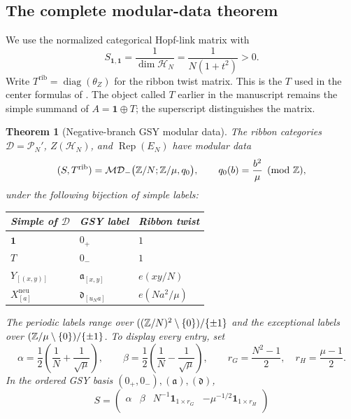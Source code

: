 \documentclass[11pt,a4paper]{article}
\numberwithin{equation}{section}
\newtheorem{theorem}{Theorem}[section]
\theoremstyle{definition}\newtheorem{definition}[theorem]{Definition}
\theoremstyle{remark}\newtheorem{remark}[theorem]{Remark}
\newcommand{\one}{\mathbf1}\newcommand{\B}{\mathcal B}\newcommand{\W}{W_N}
\newcommand{\Rep}{\operatorname{Rep}}\newcommand{\Ext}{\operatorname{Ext}}
\newcommand{\diag}{\operatorname{diag}}\renewcommand{\Vec}{\operatorname{Vec}}
\begin{document}
\subsection{The complete modular-data theorem}

We use the normalized categorical Hopf-link matrix with
\begin{equation}\label{eq:gsy-normalization}
 S_{\one,\one}=\frac1{\dim\mathcal H_N}
              =\frac1{N(1+t^2)}>0.
\end{equation}
Write $T^{\mathrm{rib}}=\diag(\theta_Z)$ for the ribbon twist matrix.
This is the $T$ used in the center formulas of \cite{gsy}.
The object called $T$ earlier in the manuscript remains the simple
summand of $A=\one\oplus T$; the superscript distinguishes the matrix.

\begin{theorem}[Negative-branch GSY modular data]\label{thm:gsy-modular}
The ribbon categories $\mathcal D=\mathcal P_N'$,
$Z(\mathcal H_N)$, and $\Rep(E_N)$ have modular data
\begin{equation}\label{eq:gsy-identification}
 (S,T^{\mathrm{rib}})
 =\mathcal{MD}_{-}\bigl(\mathbb Z/N;\mathbb Z/\mu,q_0\bigr),
 \qquad q_0(b)=\frac{b^2}{\mu}\pmod{\mathbb Z},
\end{equation}
under the following bijection of simple labels:
\begin{center}
\begin{tabular}{@{}lll@{}}
\toprule
Simple of $\mathcal D$ & GSY label & Ribbon twist\\
\midrule
$\one$ & $0_+$ & $1$\\
$T$ & $0_-$ & $1$\\
$Y_{[(x,y)]}$ & $\mathfrak a_{[x,y]}$ & $e(xy/N)$\\
$X^{\mathrm{neu}}_{[a]}$ & $\mathfrak d_{[u_Na]}$ & $e(Na^2/\mu)$\\
\bottomrule
\end{tabular}
\end{center}
The periodic labels range over
$((\mathbb Z/N)^2\setminus\{0\})/\{\pm1\}$ and the exceptional labels over
$(\mathbb Z/\mu\setminus\{0\})/\{\pm1\}$.
To display every entry, set
\[
 \alpha=\frac12\left(\frac1N+\frac1{\sqrt\mu}\right),
 \qquad
 \beta=\frac12\left(\frac1N-\frac1{\sqrt\mu}\right),
 \qquad r_G=\frac{N^2-1}{2},\quad r_H=\frac{\mu-1}{2}.
\]
In the ordered GSY basis $(0_+,0_-),(\mathfrak a),(\mathfrak d)$,
\begin{equation}\label{eq:gsy-full-S}
 S=\begin{pmatrix}
 \alpha&\beta&N^{-1}\mathbf1_{1\times r_G}&-\mu^{-1/2}\mathbf1_{1\times r_H}\\

\end{pmatrix}
\end{equation}
\end{theorem}
\end{document}
